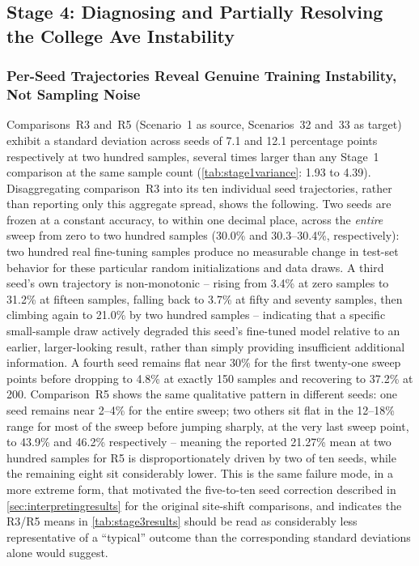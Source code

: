 \documentclass{iutbscthesis}
\begin{document}
\subsection{Stage 4: Diagnosing and Partially Resolving the College Ave Instability}
\label{sec:stage4findings}

\subsubsection{Per-Seed Trajectories Reveal Genuine Training Instability, Not Sampling Noise}

Comparisons~R3 and~R5 (Scenario~1 as source, Scenarios~32 and~33 as target) exhibit a standard deviation across seeds of 7.1 and 12.1 percentage points respectively at two hundred samples, several times larger than any Stage~1 comparison at the same sample count (\autoref{tab:stage1variance}: 1.93 to 4.39). Disaggregating comparison~R3 into its ten individual seed trajectories, rather than reporting only this aggregate spread, shows the following. Two seeds are frozen at a constant accuracy, to within one decimal place, across the \emph{entire} sweep from zero to two hundred samples (30.0\% and 30.3--30.4\%, respectively): two hundred real fine-tuning samples produce no measurable change in test-set behavior for these particular random initializations and data draws. A third seed's own trajectory is non-monotonic -- rising from 3.4\% at zero samples to 31.2\% at fifteen samples, falling back to 3.7\% at fifty and seventy samples, then climbing again to 21.0\% by two hundred samples -- indicating that a specific small-sample draw actively degraded this seed's fine-tuned model relative to an earlier, larger-looking result, rather than simply providing insufficient additional information. A fourth seed remains flat near 30\% for the first twenty-one sweep points before dropping to 4.8\% at exactly 150 samples and recovering to 37.2\% at 200. Comparison~R5 shows the same qualitative pattern in different seeds: one seed remains near 2--4\% for the entire sweep; two others sit flat in the 12--18\% range for most of the sweep before jumping sharply, at the very last sweep point, to 43.9\% and 46.2\% respectively -- meaning the reported 21.27\% mean at two hundred samples for R5 is disproportionately driven by two of ten seeds, while the remaining eight sit considerably lower. This is the same failure mode, in a more extreme form, that motivated the five-to-ten seed correction described in \autoref{sec:interpretingresults} for the original site-shift comparisons, and indicates the R3/R5 means in \autoref{tab:stage3results} should be read as considerably less representative of a ``typical'' outcome than the corresponding standard deviations alone would suggest.
\end{document}
